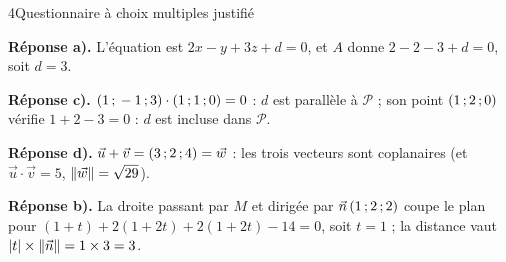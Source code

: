 \begin{corrigeBac}{4}{Questionnaire à choix multiples justifié}
\begin{questions}
  \item \textbf{Réponse a).} L'équation est $2x-y+3z+d=0$, et $A$ donne $2-2-3+d=0$, soit $d=3$. \pts{1 pt}
  \item \textbf{Réponse c).} $(1\,{;}\,-1\,{;}\,3)\cdot(1\,{;}\,1\,{;}\,0)=0$ : $d$ est parallèle à $\mathcal{P}$ ; son point $(1\,{;}\,2\,{;}\,0)$ vérifie
    $1+2-3=0$ : $d$ est incluse dans $\mathcal{P}$. \pts{1 pt}
  \item \textbf{Réponse d).} $\vec u+\vec v=(3\,{;}\,2\,{;}\,4)=\vec w$ : les trois vecteurs sont coplanaires (et $\vec u\cdot\vec v=5$,
    $\left\lVert\vec w\right\rVert=\sqrt{29}$). \pts{1 pt}
  \item \textbf{Réponse b).} La droite passant par $M$ et dirigée par $\vec n\,(1\,{;}\,2\,{;}\,2)$ coupe le plan pour
    $(1+t)+2(1+2t)+2(1+2t)-14=0$, soit $t=1$ ; la distance vaut $|t|\times\left\lVert\vec n\right\rVert=1\times3=3$. \pts{1 pt}
\end{questions}
\end{corrigeBac}

